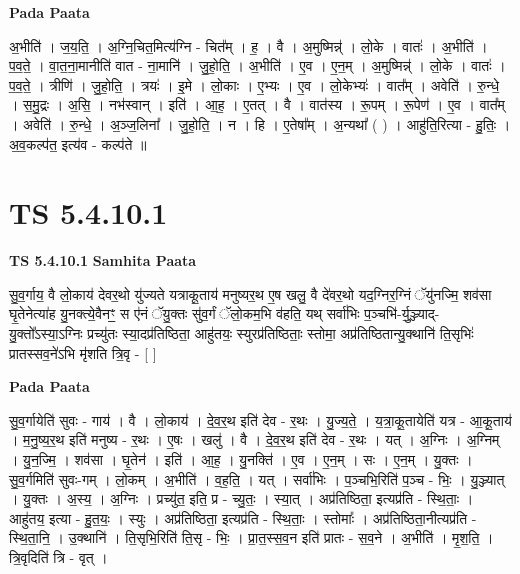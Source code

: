 \documentclass[17pt]{extarticle}
\begin{document}
\textbf{Pada Paata} \newline

अ॒भीति॑ । ज॒य॒ति॒ । अ॒ग्नि॒चित॒मित्य॑ग्नि - चित᳚म् । ह॒ । वै । अ॒मुष्मिन्न्॑ । लो॒के । वातः॑ । अ॒भीति॑ । प॒व॒ते॒ । वा॒त॒ना॒मानीति॑ वात - ना॒मानि॑ । जु॒हो॒ति॒ । अ॒भीति॑ । ए॒व । ए॒न॒म् । अ॒मुष्मिन्न्॑ । लो॒के । वातः॑ । प॒व॒ते॒ । त्रीणि॑ । जु॒हो॒ति॒ । त्रयः॑ । इ॒मे । लो॒काः । ए॒भ्यः । ए॒व । लो॒केभ्यः॑ । वात᳚म् । अवेति॑ । रु॒न्धे॒ । स॒मु॒द्रः । अ॒सि॒ । नभ॑स्वान् । इति॑ । आ॒ह॒ । ए॒तत् । वै । वात॑स्य । रू॒पम् । रू॒पेण॑ । ए॒व । वात᳚म् । अवेति॑ । रु॒न्धे॒ । अ॒ञ्ज॒लिना᳚ । जु॒हो॒ति॒ । न । हि । ए॒तेषा᳚म् । अ॒न्यथा᳚ ( ) । आहु॑ति॒रित्या - हु॒तिः॒ । अ॒व॒कल्प॑त॒ इत्य॑व - कल्प॑ते ॥  \newline





\section{ TS 5.4.10.1 }

\textbf{TS 5.4.10.1 } \newline
\textbf{Samhita Paata} \newline

सु॒व॒र्गाय॒ वै लो॒काय॑ देवर॒थो यु॑ज्यते यत्राकू॒ताय॑ मनुष्यर॒थ ए॒ष खलु॒ वै दे॑वर॒थो यद॒ग्निर॒ग्निं ॅयु॑नज्मि॒ शव॑सा घृ॒तेनेत्या॑ह यु॒नक्त्ये॒वैनꣳ॒॒ स ए॑नं ॅयु॒क्तः सु॑व॒र्गं ॅलो॒कम॒भि व॑हति॒ यथ् सर्वा॑भिः प॒ञ्चभि॑-र्यु॒ञ्ज्याद्-यु॒क्तो᳚ऽस्या॒ऽग्निः प्रच्यु॑तः स्या॒दप्र॑तिष्ठिता॒ आहु॑तयः॒ स्युरप्र॑तिष्ठिताः॒ स्तोमा॒ अप्र॑तिष्ठितान्यु॒क्थानि॑ ति॒सृभिः॑ प्रातस्सव॒ने॑ऽभि मृ॑शति त्रि॒वृ - [  ] \newline

\textbf{Pada Paata} \newline

सु॒व॒र्गायेति॑ सुवः - गाय॑ । वै । लो॒काय॑ । दे॒व॒र॒थ इति॑ देव - र॒थः । यु॒ज्य॒ते॒ । य॒त्रा॒कू॒तायेति॑ यत्र - आ॒कू॒ताय॑ । म॒नु॒ष्य॒र॒थ इति॑ मनुष्य - र॒थः । ए॒षः । खलु॑ । वै । दे॒व॒र॒थ इति॑ देव - र॒थः । यत् । अ॒ग्निः । अ॒ग्निम् । यु॒न॒ज्मि॒ । शव॑सा । घृ॒तेन॑ । इति॑ । आ॒ह॒ । यु॒नक्ति॑ । ए॒व । ए॒न॒म् । सः । ए॒न॒म् । यु॒क्तः । सु॒व॒र्गमिति॑ सुवः-गम् । लो॒कम् । अ॒भीति॑ । व॒ह॒ति॒ । यत् । सर्वा॑भिः । प॒ञ्चभि॒रिति॑ प॒ञ्च - भिः॒ । यु॒ञ्ज्यात् । यु॒क्तः । अ॒स्य॒ । अ॒ग्निः । प्रच्यु॑त॒ इति॒ प्र - च्यु॒तः॒ । स्या॒त् । अप्र॑तिष्ठिता॒ इत्यप्र॑ति - स्थि॒ताः॒ । आहु॑तय॒ इत्या - हु॒त॒यः॒ । स्युः । अप्र॑तिष्ठिता॒ इत्यप्र॑ति - स्थि॒ताः॒ । स्तोमाः᳚ । अप्र॑तिष्ठिता॒नीत्यप्र॑ति - स्थि॒ता॒नि॒ । उ॒क्थानि॑ । ति॒सृभि॒रिति॑ ति॒सृ - भिः॒ । प्रा॒त॒स्स॒व॒न इति॑ प्रातः - स॒व॒ने । अ॒भीति॑ । मृ॒श॒ति॒ । त्रि॒वृदिति॑ त्रि - वृत् ।  \newline
\end{document}
